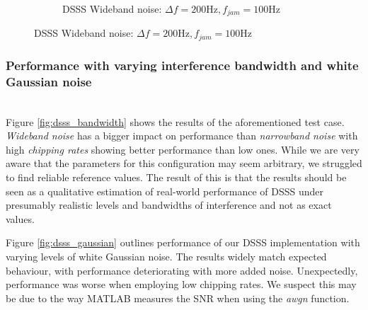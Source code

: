 \begin{figure}[H]
\begin{subfigure}[b]{0.5\textwidth}
						\caption{DSSS Wideband noise: $\Delta f = 200 \text{Hz}, f_{jam} = 100\text{Hz}$}
						\label{fig:dsss_wideband}
					\end{subfigure}
				\end{figure}
				
		
		\subsubsection{Performance with varying interference bandwidth and white Gaussian noise}\label{sec:real-life}~\\
			Figure \ref{fig:dsss_bandwidth} shows the results of the aforementioned test case.
			\emph{Wideband noise} has a bigger impact on performance than \emph{narrowband noise} with high \emph{chipping rates} showing better performance than low ones.
			While we are very aware that the parameters for this configuration may seem arbitrary, we struggled to find reliable reference values. The result of this is that the results should be seen as a qualitative estimation of real-world performance of DSSS under presumably realistic levels and bandwidths of interference and not as exact values. 
			
			Figure \ref{fig:dsss_gaussian} outlines performance of our DSSS implementation with varying levels of white Gaussian noise.
			The results widely match expected behaviour, with performance deteriorating with more added noise.
			Unexpectedly, performance was worse when employing low chipping rates.
			We suspect this may be due to the way MATLAB measures the SNR when using the \emph{awgn} function.
			

